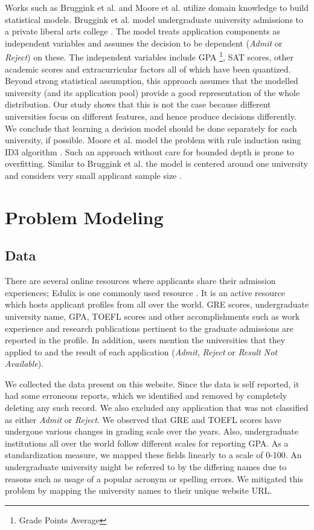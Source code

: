 \documentclass{sig-alternate-05-2015}
\begin{document}
Works such as Bruggink et al. and Moore et al. utilize domain knowledge to build statistical models\cite{bruggink, moore}. Bruggink et al. model undergraduate university admissions to a private liberal arts college \cite{bruggink}. The model treats application components as independent variables 	and assumes the decision to be dependent (\textit{Admit} or \textit{Reject}) on these. The independent variables include GPA \footnote{Grade Points Average}, SAT scores, other academic scores and extracurricular factors all of which have been quantized. Beyond strong statistical assumption, this approach assumes that the modelled university (and its application pool) provide a good representation of the whole distribution. Our study shows that this is not the case because different universities focus on different features, and hence produce decisions differently. We conclude that learning a decision model should be done separately for each university, if possible. Moore et al. model the problem with rule induction using ID3 algorithm \cite{moore}. Such an approach without care for bounded depth is prone to overfitting. Similar to Bruggink et al. the model is centered around one university and considers very small applicant sample size \cite{bruggink}.


\section{Problem Modeling}
\label{sec:problem-modeling}

\subsection{Data}
\label{subsec:dataset}
\label{subsec:dataset}
There are several online resources where applicants share their admission experiences; Edulix is one commonly used resource \cite{edulix}. It is an active resource which hosts applicant profiles from all over the world. GRE scores, undergraduate university name, GPA, TOEFL scores and other accomplishments such as work experience and research publications pertinent to the graduate admissions are reported in the profile. In addition, users mention the universities that they applied to and the result of each application (\textit{Admit}, \textit{Reject} or \textit{Result Not Available}).

We collected the data present on this website. Since the data is self reported, it had some erroneous reports, which we identified and removed by completely deleting any such record. We also excluded any application that was not classified as either \textit{Admit} or \textit{Reject}. We observed that GRE and TOEFL scores have undergone various changes in grading scale over the years. Also, undergraduate institutions all over the world follow different scales for reporting GPA. As a standardization measure, we mapped these fields linearly to a scale of 0-100. An undergraduate university might be referred to by the differing names due to reasons such as usage of a popular acronym or spelling errors. We mitigated this problem by mapping the university names to their unique website URL.
\end{document}
